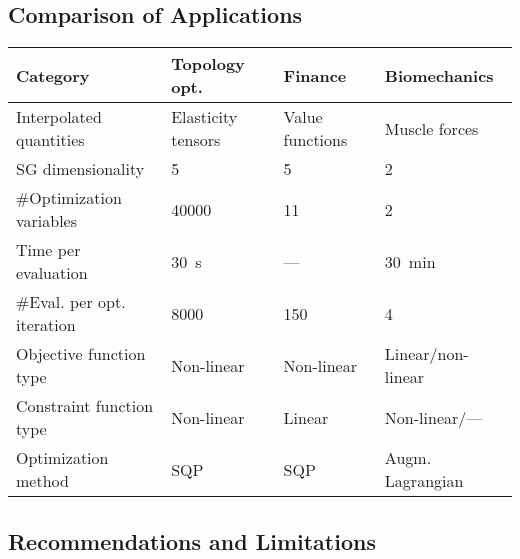 \subsection*{Comparison of Applications}

\begin{frame}{\insertsubsection}
  \begin{center}
    \begin{tabular}{llll}
      \toprule
      \textbf{Category}&          \textbf{Topology opt.}& \textbf{Finance}& \textbf{Biomechanics}\\
      \midrule
      Interpolated quantities&    Elasticity tensors&     Value functions&  Muscle forces\\
      SG dimensionality&          5&                      5&                2\\
      \#Optimization variables&   \num{40000}&            11&               2\\
      Time per evaluation&        \SI{30}{\second}&       ---&              \SI{30}{\minute}\\
      \#Eval. per opt. iteration& \num{8000}&             150&              4\\
      Objective function type&    Non-linear&             Non-linear&       Linear/non-linear\\
      Constraint function type&   Non-linear&             Linear&           Non-linear/---\\
      Optimization method&        SQP&                    SQP&              Augm. Lagrangian\\
      \bottomrule
    \end{tabular}
  \end{center}
\end{frame}



\subsection*{Recommendations and Limitations}

